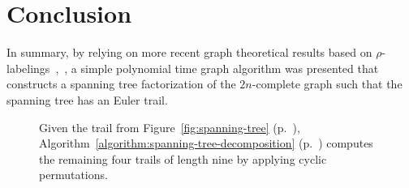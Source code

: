 \documentclass{article}
\begin{document}
\section{Conclusion}

In summary, by relying on more recent graph theoretical results based on $\rho$-labelings~\cite{E97},~\cite{F04}, a simple polynomial time graph algorithm was presented that constructs a spanning tree factorization of the $2n$-complete graph such that the spanning tree has an Euler trail.

\begin{figure}[t]
\label{fig:spanning-tree-decomposition}
\caption{Given the trail from Figure~\ref{fig:spanning-tree} (p.~\pageref{fig:spanning-tree}), Algorithm~\ref{algorithm:spanning-tree-decomposition} (p.~\pageref{algorithm:spanning-tree-decomposition}) computes the remaining four trails of length nine by applying cyclic permutations.}
\end{figure}



\end{document}
